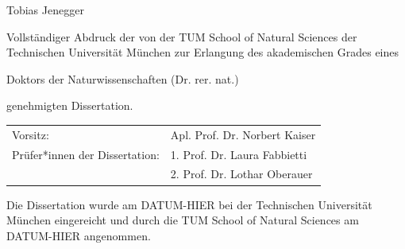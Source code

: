 \documentclass[12pt,twoside]{article}
\begin{document}
\begin{titlepage}
{  %
  
  {Tobias Jenegger}
  
  \vspace*{2\baselineskip} %

	Vollst\"andiger Abdruck der von der TUM School of Natural Sciences der Technischen
	Universit\"at M\"unchen zur Erlangung des akademischen Grades eines

	\vspace*{2ex}
	Doktors der Naturwissenschaften (Dr. rer. nat.)
	\vspace*{2ex}

	genehmigten Dissertation.

  \vspace*{\fill}

% 
% 
% 

  	\begin{tabularx}{1.0\textwidth}{XX}
	Vorsitz:	&	Apl. Prof. Dr. Norbert Kaiser \\
	Pr\"ufer*innen der Dissertation:	&	1. Prof. Dr. Laura Fabbietti \\
							        &	2. Prof. Dr. Lothar Oberauer \\
							
	\end{tabularx}


	\vspace*{\fill}

	Die Dissertation wurde am DATUM-HIER bei der Technischen Universit\"at M\"unchen
	eingereicht und durch die TUM School of Natural Sciences am DATUM-HIER angenommen.

  \vspace*{\fill}

  \null
  \vfill

}
\end{titlepage}
\end{document}
